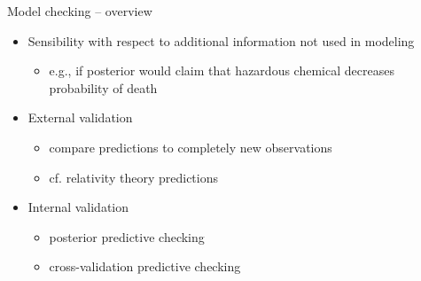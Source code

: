 \documentclass[t]{beamer}
\begin{document}
 \begin{frame}{Model checking -- overview}

  \begin{itemize}
  \item<+-> Sensibility with respect to additional information not used in modeling
    \begin{itemize}
    \item e.g., if posterior would claim that hazardous chemical
      decreases probability of death
    \end{itemize}
  \item<+-> External validation
    \begin{itemize}
    \item compare predictions to completely new observations
    \item cf. relativity theory predictions
    \end{itemize}
  \item<+-> Internal validation
    \begin{itemize}
    \item posterior predictive checking
    \item cross-validation predictive checking
    \end{itemize}
  \end{itemize}

\end{frame}
\end{document}

